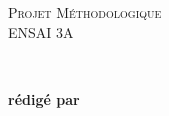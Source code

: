 \begin{titlepage}

	\begin{center}

		

		\textsc{\LARGE Projet Méthodologique }\\[0.5cm]
		{\Large ENSAI 3A}\\ [1cm]

		\HRule%
		\vspace{0.4cm}

		{\huge \bfseries \articletitle}\\[0.4cm]
		
		\HRule%
		\vspace{1.5cm}

	\vfill
	\end{center}
	
	
	
	\begin{flushright} \Large
		\textbf{rédigé par}%
		\\
		\auteur%
	\end{flushright}



	\begin{center}
		{\large{\customdate}}
	\end{center}
\end{titlepage}
